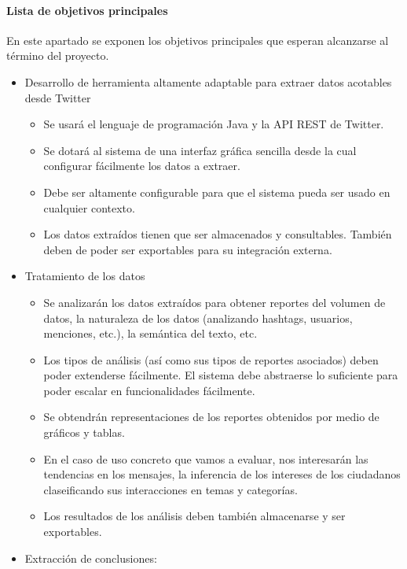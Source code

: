 \paragraph{Lista de objetivos principales}
En este apartado se exponen los objetivos principales que esperan alcanzarse al término del proyecto. 
\begin{itemize}
        \item Desarrollo de herramienta altamente adaptable para extraer datos acotables desde Twitter
        \begin{itemize}
                \item Se usará el lenguaje de programación Java y la API REST de Twitter.
                \item Se dotará al sistema de una interfaz gráfica sencilla desde la cual configurar fácilmente los datos a extraer. 
                \item Debe ser altamente configurable para que el sistema pueda ser usado en cualquier contexto.
                \item Los datos extraídos tienen que ser almacenados y consultables. También deben de poder ser exportables para su integración externa.
        \end{itemize}
       	\item Tratamiento de los datos
       	\begin{itemize}
       		\item Se analizarán los datos extraídos para obtener reportes del volumen de datos, la naturaleza de los datos (analizando hashtags, usuarios, menciones, etc.), la semántica del texto, etc.
       		\item Los tipos de análisis (así como sus tipos de reportes asociados) deben poder extenderse fácilmente. El sistema debe abstraerse lo suficiente para poder escalar en funcionalidades fácilmente.
       		\item Se obtendrán representaciones de los reportes obtenidos por medio de gráficos y tablas. 
       		\item En el caso de uso concreto que vamos a evaluar, nos interesarán las tendencias en los mensajes, la inferencia de los intereses de los ciudadanos claseificando sus interacciones en temas y categorías.
       		\item Los resultados de los análisis deben también almacenarse y ser exportables.
       	\end{itemize}
       \item Extracción de conclusiones:
       \begin{itemize}

\end{itemize}
\end{itemize}
